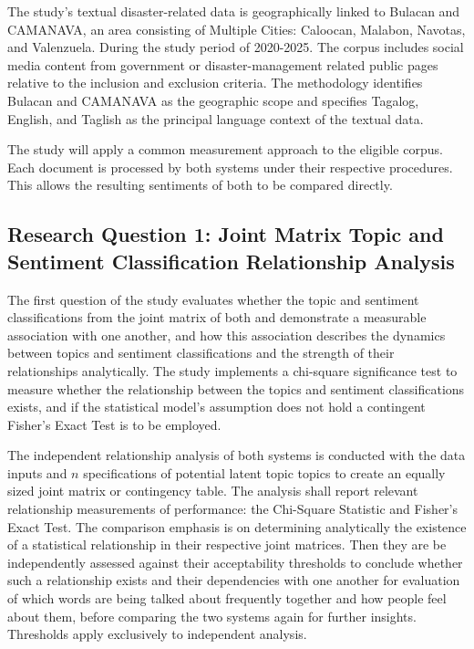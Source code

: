 The study’s textual disaster-related data is geographically linked to Bulacan and CAMANAVA, an area consisting of Multiple Cities: Caloocan, Malabon, Navotas, and Valenzuela. During the study period of 2020-2025. The corpus includes social media content from government or disaster-management related public pages relative to the inclusion and exclusion criteria. The methodology identifies Bulacan and CAMANAVA as the geographic scope and specifies Tagalog, English, and Taglish as the principal language context of the textual data.


The study will apply a common measurement approach to the eligible corpus. Each
document is processed by both systems under their respective procedures. This
allows the resulting sentiments of both to be compared directly.

\subsection*{Research Question 1: Joint Matrix Topic and Sentiment Classification Relationship Analysis}

The first question of the study evaluates whether the topic
and sentiment classifications from the joint matrix of both \sysA{} and \sysB{}
demonstrate a measurable association with one another, and how this association
describes the dynamics between topics and sentiment classifications and
the strength of their relationships analytically. The study implements a
chi-square significance test to measure whether the relationship between the
topics and sentiment classifications exists, and if the statistical model's assumption does not hold a contingent Fisher's Exact Test is to be employed.

The independent relationship analysis of both systems is conducted with
the data inputs and $n$ specifications of potential latent topic topics to
create an equally sized joint matrix or contingency table. The analysis shall
report relevant relationship measurements of performance: the Chi-Square
Statistic and Fisher's Exact Test. The comparison emphasis is on determining
analytically the existence of a statistical relationship in their respective
joint matrices. Then they are be independently assessed against their
acceptability thresholds to conclude whether such a relationship exists and their dependencies with one another for evaluation of which words are being talked about
frequently together and how people feel about them, before comparing the two
systems again for further insights. Thresholds apply exclusively to independent
analysis.

